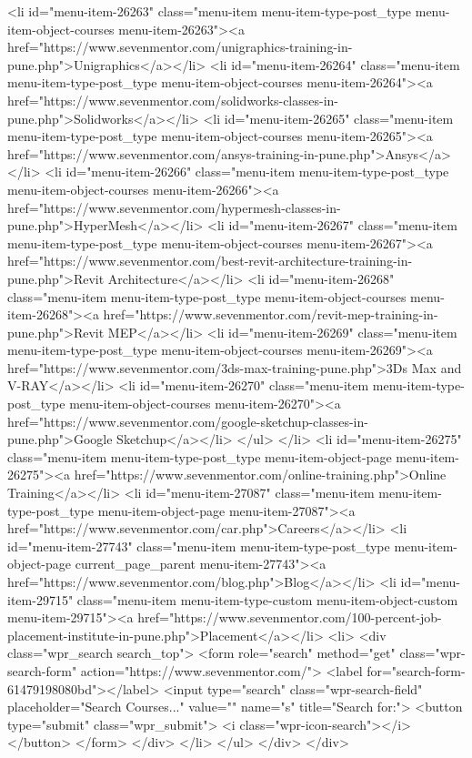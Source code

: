 {<li id="menu-item-26263" class="menu-item menu-item-type-post_type menu-item-object-courses menu-item-26263"><a href="https://www.sevenmentor.com/unigraphics-training-in-pune.php">Unigraphics</a></li>
<li id="menu-item-26264" class="menu-item menu-item-type-post_type menu-item-object-courses menu-item-26264"><a href="https://www.sevenmentor.com/solidworks-classes-in-pune.php">Solidworks</a></li>
<li id="menu-item-26265" class="menu-item menu-item-type-post_type menu-item-object-courses menu-item-26265"><a href="https://www.sevenmentor.com/ansys-training-in-pune.php">Ansys</a></li>
<li id="menu-item-26266" class="menu-item menu-item-type-post_type menu-item-object-courses menu-item-26266"><a href="https://www.sevenmentor.com/hypermesh-classes-in-pune.php">HyperMesh</a></li>
<li id="menu-item-26267" class="menu-item menu-item-type-post_type menu-item-object-courses menu-item-26267"><a href="https://www.sevenmentor.com/best-revit-architecture-training-in-pune.php">Revit Architecture</a></li>
<li id="menu-item-26268" class="menu-item menu-item-type-post_type menu-item-object-courses menu-item-26268"><a href="https://www.sevenmentor.com/revit-mep-training-in-pune.php">Revit MEP</a></li>
<li id="menu-item-26269" class="menu-item menu-item-type-post_type menu-item-object-courses menu-item-26269"><a href="https://www.sevenmentor.com/3ds-max-training-pune.php">3Ds Max and V-RAY</a></li>
<li id="menu-item-26270" class="menu-item menu-item-type-post_type menu-item-object-courses menu-item-26270"><a href="https://www.sevenmentor.com/google-sketchup-classes-in-pune.php">Google Sketchup</a></li>
</ul>
</li>
<li id="menu-item-26275" class="menu-item menu-item-type-post_type menu-item-object-page menu-item-26275"><a href="https://www.sevenmentor.com/online-training.php">Online Training</a></li>
<li id="menu-item-27087" class="menu-item menu-item-type-post_type menu-item-object-page menu-item-27087"><a href="https://www.sevenmentor.com/car.php">Careers</a></li>
<li id="menu-item-27743" class="menu-item menu-item-type-post_type menu-item-object-page current_page_parent menu-item-27743"><a href="https://www.sevenmentor.com/blog.php">Blog</a></li>
<li id="menu-item-29715" class="menu-item menu-item-type-custom menu-item-object-custom menu-item-29715"><a href="https://www.sevenmentor.com/100-percent-job-placement-institute-in-pune.php">Placement</a></li>
<li>
<div class="wpr_search search_top">
<form role="search" method="get" class="wpr-search-form" action="https://www.sevenmentor.com/">
<label for="search-form-61479198080bd"></label>
<input type="search" class="wpr-search-field" placeholder="Search Courses..." value="" name="s" title="Search for:">
<button type="submit" class="wpr_submit">
<i class="wpr-icon-search"></i>
</button>
</form> </div>
</li>
</ul>
</div>
</div>

}
